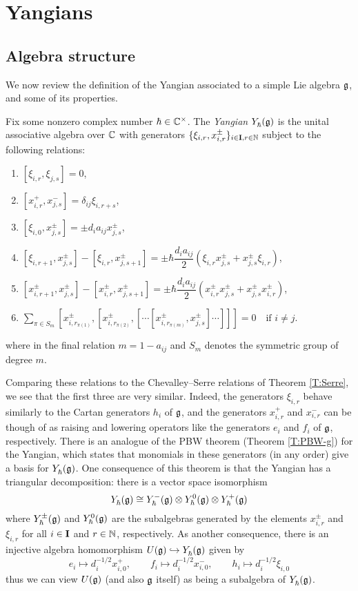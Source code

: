 \section{Yangians}

\subsection{Algebra structure}

We now review the definition of the Yangian associated to a simple Lie algebra $\g$, and some of its properties.

\begin{definition}\label{D:Y}
    Fix some nonzero complex number $\hbar\in\C^\times$.
    The \emph{Yangian} $\Yhg$ is the unital associative algebra over $\C$ with generators $\{\xi_{i,r}, x^\pm_{i,r}\}_{i\in\I,r\in\N}$ subject to the following relations:
    \begin{enumerate}
        \item $[\xi_{i,r},\xi_{j,s}] = 0$,
        \item $[x^+_{i,r},x^-_{j,s}] = \delta_{ij}\xi_{i,r+s}$,
        \item $[\xi_{i,0},x^\pm_{j,s}] = \pm d_ia_{ij}x^\pm_{j,s}$,
        \item $[\xi_{i,r+1},x^\pm_{j,s}]-[\xi_{i,r},x^\pm_{j,s+1}] = \pm\hbar\dfrac{d_ia_{ij}}{2}(\xi_{i,r}x^\pm_{j,s}+x^\pm_{j,s}\xi_{i,r})$,
        \item $[x^\pm_{i,r+1},x^\pm_{j,s}]-[x^\pm_{i,r},x^\pm_{j,s+1}] = \pm\hbar\dfrac{d_ia_{ij}}{2}(x^\pm_{i,r}x^\pm_{j,s}+x^\pm_{j,s}x^\pm_{i,r})$,
        \item $\displaystyle\sum\limits_{\pi\in S_m}[x^\pm_{i,r_{\pi(1)}}, [x^\pm_{i,r_{\pi(2)}}, [\cdots[x^\pm_{i,r_{\pi(m)}}, x^\pm_{j,s}]\cdots]]]=0 \quad\text{if } i\neq j$.
    \end{enumerate}
    where in the final relation $m=1-a_{ij}$ and $S_m$ denotes the symmetric group of degree $m$.
\end{definition}

Comparing these relations to the Chevalley--Serre relations of Theorem \ref{T:Serre}, we see that the first three are very similar.
Indeed, the generators $\xi_{i,r}$ behave similarly to the Cartan generators $h_i$ of $\g$, and the generators $x^+_{i,r}$ and $x^-_{i,r}$ can be though of as raising and lowering operators like the generators $e_i$ and $f_i$ of $\g$, respectively.
There is an analogue of the PBW theorem (Theorem \ref{T:PBW-g}) for the Yangian, which states that monomials in these generators (in any order) give a basis for $\Yhg$.
One consequence of this theorem is that the Yangian has a triangular decomposition: there is a vector space isomorphism
\[\Yhg \cong \Yhg[-]\otimes\Yhg[0]\otimes\Yhg[+]\]
where $\Yhg[\pm]$ and $\Yhg[0]$ are the subalgebras generated by the elements $x^\pm_{i,r}$ and $\xi_{i,r}$ for all $i\in\I$ and $r\in\N$, respectively.
As another consequence, there is an injective algebra homomorphism $\Ug\inj\Yhg$ given by
\[e_i\mapsto d_i^{-1/2}x^+_{i,0}, \qquad f_i\mapsto d_i^{-1/2}x^-_{i,0}, \qquad h_i\mapsto d_i^{-1/2}\xi_{i,0}\]
thus we can view $\Ug$ (and also $\g$ itself) as being a subalgebra of $\Yhg$.

